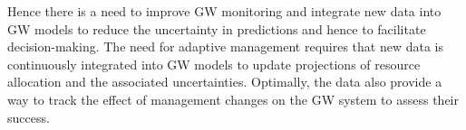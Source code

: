 \documentclass[11pt,final]{article}%
\begin{document}
Hence there is a need to improve GW monitoring and integrate new data into GW models to reduce the uncertainty in predictions and hence to facilitate decision-making. The need for adaptive management requires that new data is continuously integrated into GW models to update projections of resource allocation and the associated uncertainties. Optimally, the data also provide a way to track the effect of management changes on the GW system to assess their success.







\end{document}
